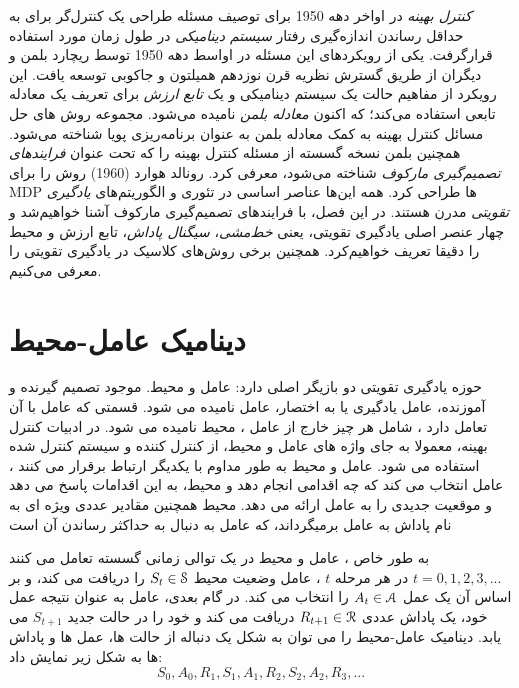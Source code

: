 

 \textit{کنترل بهینه}
در اواخر دهه 1950 برای توصیف مسئله طراحی یک کنترل‌گر برای به حداقل رساندن اندازه‌گیری رفتار \textit{سیستم دینامیکی} در طول زمان مورد استفاده قرارگرفت. یکی از رویکردهای این مسئله در اواسط دهه 1950 توسط ریچارد بلمن و دیگران از طریق گسترش نظریه قرن نوزدهم همیلتون و جاکوبی توسعه یافت. این رویکرد از مفاهیم حالت یک سیستم دینامیکی و یک \textit{تابع ارزش} برای تعریف یک معادله تابعی استفاده می‌کند؛ که اکنون \textit{معادله بلمن} نامیده می‌شود. مجموعه روش های حل مسائل کنترل بهینه به کمک معادله بلمن به عنوان برنامه‌ریزی پویا شناخته می‌شود. همچنین بلمن نسخه گسسته از مسئله کنترل بهینه را که تحت عنوان \textit{فرایندهای تصمیم‌گیری مارکوف} 
 شناخته می‌شود، معرفی کرد. رونالد هوارد (1960) روش
  را برای MDP ها طراحی کرد. همه این‌ها عناصر اساسی در تئوری و الگوریتم‌های \textit{یادگیری تقویتی} مدرن هستند.
  در این فصل، با فرایندهای تصمیم‌گیری مارکوف آشنا خواهیم‌شد و چهار عنصر اصلی یادگیری تقویتی، یعنی \textit{خط‌مشی}، \textit{سیگنال پاداش}، تابع ارزش و محیط را دقیقا تعریف خواهیم‌کرد. همچنین برخی روش‌های کلاسیک در یادگیری تقویتی را معرفی می‌کنیم.

\section{دینامیک عامل-محیط}
حوزه یادگیری تقویتی  دو بازیگر اصلی دارد: عامل و محیط. موجود تصمیم گیرنده و آموزنده، عامل یادگیری یا به اختصار، عامل نامیده می شود. قسمتی که عامل با آن تعامل دارد ، شامل
هر چیز خارج از عامل ، محیط نامیده می شود.  در ادبیات کنترل بهینه، معمولا به  جای واژه های عامل و محیط، از کنترل کننده و سیستم کنترل شده استفاده می شود.
 عامل و محیط به طور مداوم با یکدیگر ارتباط برقرار می کنند ، عامل انتخاب می کند که چه اقدامی انجام دهد و محیط، به این اقدامات پاسخ می دهد و موقعیت جدیدی را به عامل ارائه می دهد.
محیط همچنین مقادیر عددی ویژه ای به نام پاداش  به عامل برمیگرداند، که عامل به دنبال به حداکثر رساندن آن است

به طور خاص ، عامل و محیط در یک توالی زمانی گسسته تعامل می کنند 
$t = 0,1,2,3,...$
در هر مرحله $t$ ، عامل وضعیت محیط  
$S_t \in \EuScript{S}$
را دریافت می کند، و بر اساس آن یک عمل 
$A_t \in \EuScript{A}$
را انتخاب می کند. در گام بعدی، عامل به عنوان نتیجه عمل خود، یک پاداش عددی $R_{t+1} \in \EuScript{R}$ دریافت می کند و خود را در حالت جدید $S_{t+1}$ می یابد.
دینامیک عامل-محیط را می توان به شکل یک دنباله از حالت ها، عمل ها و پاداش ها به شکل زیر نمایش داد:
$$S_0, A_0, R_1, S_1, A_1, R_2, S_2, A_2, R_3, ...$$

